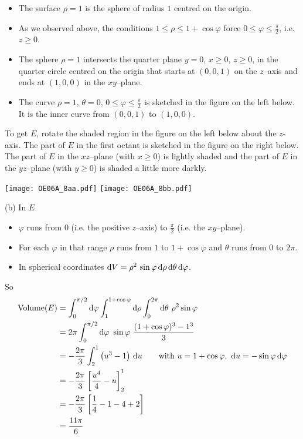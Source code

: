 \begin{solution}
\begin{itemize}
\begin{itemize}
\item
The surface $\rho=1$ is the sphere of radius $1$ centred on the origin.

\item
As we observed above, the conditions $1\le\rho\le 1+\cos\varphi$
force $0\le\varphi\le\frac{\pi}{2}$, i.e. $z\ge 0$.

\item 
The sphere $\rho=1$ intersects the quarter plane $y=0$, $x\ge 0$, $z\ge 0$, 
in the quarter circle centred on the origin that starts at $(0,0,1)$ 
on the $z$--axis and ends at $(1,0,0)$ in the $xy$--plane.

\item
The curve $\rho=1$, $\theta=0$, $0\le\varphi\le\frac{\pi}{2}$
is sketched in the figure on the left below. It is the inner curve from
$(0,0,1)$ to $(1,0,0)$.

\end{itemize}
To get $E$, rotate the shaded region in the figure on the left below
about the $z$-axis. The part of $E$ in the first octant is sketched
in the figure on the right below. The part of $E$ in the $xz$--plane 
(with $x\ge 0$) is lightly shaded and the part of $E$ in the $yz$--plane 
(with $y\ge 0$) is shaded a little more darkly.

\begin{center}
     \texttt{[image: OE06A\_8aa.pdf]}\qquad
     \texttt{[image: OE06A\_8bb.pdf]}
\end{center}
\end{itemize}

(b) In $E$
\begin{itemize}
\item
$\varphi$ runs from $0$ (i.e. the positive $z$--axis) to $\frac{\pi}{2}$
(i.e. the $xy$--plane).
\item
For each $\varphi$ in that range $\rho$ runs from $1$ to 
$1+\cos\varphi$ and $\theta$ runs from $0$ to $2\pi$.
\item
In spherical coordinates $\mathrm{d}V = \rho^2\,\sin\varphi\,\mathrm{d}\rho\,
     \mathrm{d}\theta\,\mathrm{d}\varphi$.
\end{itemize}
So
\begin{align*}
\text{Volume}(E)
&=\int_0^{\pi/2}\dee{\varphi} \int_1^{1+\cos\varphi}\dee{\rho}
\int_0^{2\pi}\dee{\theta}\ \rho^2\sin\varphi \\
&=2\pi \int_0^{\pi/2}\dee{\varphi}\ \sin\varphi\ 
        \frac{(1+\cos\varphi)^3-1^3}{3} \\
&=-\frac{2\pi}{3} \int_2^1 \big(u^3-1\big)\ \dee{u}
\qquad\text{with }u=1+\cos\varphi,\ \dee{u}=-\sin\varphi\,\dee{\varphi} \\
&= -\frac{2\pi}{3}\left[\frac{u^4}{4}-u\right]_2^1 \\
&=-\frac{2\pi}{3} \left[\frac{1}{4}-1-4+2\right] \\
&=\frac{11 \pi}{6}
\end{align*}
\end{solution}


